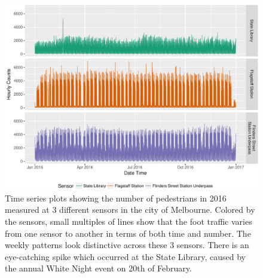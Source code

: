 \documentclass[article]{jss}
\theoremstyle{definition}
\theoremstyle{definition}
\theoremstyle{definition}
\theoremstyle{remark}
\begin{document}
\begin{CodeChunk}
\begin{figure}

{\centering \includegraphics[width=\textwidth]{figure/time-series-plot-1} 

}

\caption[Time series plots showing the number of
pedestrians in 2016 measured at 3 different sensors in the city of
Melbourne. Colored by the sensors, small multiples of lines show that
the foot traffic varies from one sensor to another in terms of both time
and number. The weekly patterns look distinctive across these 3 sensors.
There is an eye-catching spike which occurred at the State Library,
caused by the annual White Night event on 20th of February.]{Time series plots showing the number of
pedestrians in 2016 measured at 3 different sensors in the city of
Melbourne. Colored by the sensors, small multiples of lines show that
the foot traffic varies from one sensor to another in terms of both time
and number. The weekly patterns look distinctive across these 3 sensors.
There is an eye-catching spike which occurred at the State Library,
caused by the annual White Night event on 20th of February.}\label{fig:time-series-plot}
\end{figure}
\end{CodeChunk}
\end{document}
